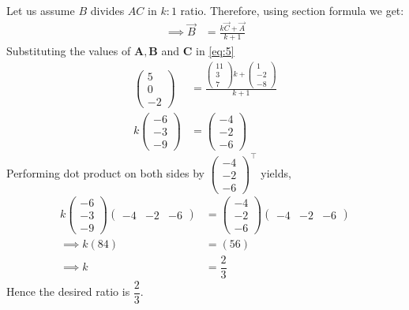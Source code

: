 \documentclass[12pt]{article}
\providecommand{\brak}[1]{\ensuremath{\left(#1\right)}}
\newcommand{\myvec}[1]{\ensuremath{\begin{pmatrix}#1\end{pmatrix}}}
\let\vec\mathbf
\begin{document}
\begin{enumerate}
Let us assume $B$ divides $AC$ in $k:1$ ratio. Therefore, using section formula we get:
\begin{align}
    \implies \Vec{B} &= \frac{k\Vec{C}+\Vec{A}}{k+1}
    \label{eq:6}
\end{align}
Substituting the values of $\vec{A},\vec{B}$ and $\vec{C}$ in \eqref{eq:5}
\begin{align}
    \myvec{5 \\ 0 \\ -2} &= \frac{\myvec{11 \\ 3 \\ 7}k + \myvec{1 \\ -2 \\ -8}}{k+1}\\
    \label{eq:7}
    k\myvec{-6 \\ -3 \\ -9} &=\myvec{-4\\-2\\-6}
    \label{eq:8}
\end{align}
Performing dot product on both sides by $\myvec{-4\\-2\\-6}^\top$ yields,
\begin{align}
    k\myvec{-6\\-3\\-9}\myvec{-4  & -2 & -6} &=\myvec{-4\\-2\\-6}\myvec{-4  & -2 & -6}\\
\implies          k\brak{84} &=\brak{56} \\
\implies          k &=\dfrac{2}{3}
\end{align}
Hence the desired ratio is $\dfrac{2}{3}$. 
\end{enumerate}
\end{document}
